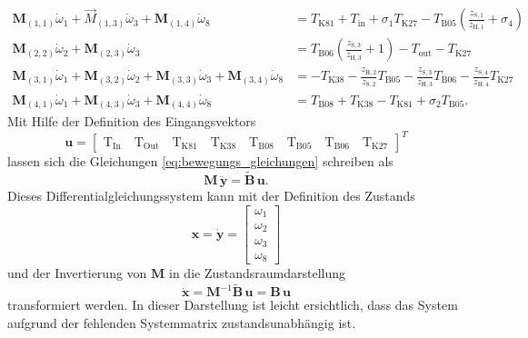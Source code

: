 \begin{subequations} \label{eq:bewegungs_gleichungen}
	\begin{align}
		\pmb{M}_{(1,1)} \dot{\omega}_1 + \Vec{M}_{(1,3)} \dot{\omega}_3 +\pmb{M}_{(1,4)} \dot{\omega}_8
		&= T_{\mathrm{K81}} +T_{\mathrm{in}} + \sigma_1 T_{\mathrm{K27}}-T_{\mathrm{B05}} {\left(\frac{z_{\mathrm{S,1}} }{z_{\mathrm{H,1}}}+\sigma_{4} \right)}\\
		\pmb{M}_{(2,2)} \dot{\omega}_2 + \pmb{M}_{(2,3)} \dot{\omega}_3
		&= T_{\mathrm{B06}} {\left(\frac{z_{\mathrm{S,3}} }{z_{\mathrm{H,3}} }+1\right)}-T_{\mathrm{out}} -T_{\mathrm{K27}} \\
		\pmb{M}_{(3,1)} \dot{\omega}_1 + \pmb{M}_{(3,2)} \dot{\omega}_2 + \pmb{M}_{(3,3)} \dot{\omega}_3 + \pmb{M}_{(3,4)} \dot{\omega}_8
		&= -T_{\mathrm{K38}} -\frac{ z_{\mathrm{H,2}} }{z_{\mathrm{S,2}} }T_{\mathrm{B05}}-\frac{z_{\mathrm{S,3}}}{z_{\mathrm{H,3}}}T_{\mathrm{B06}}-\frac{z_{\mathrm{S,4}} }{z_{\mathrm{H,4}}}T_{\mathrm{K27}}\\
		\pmb{M}_{(4,1)} \dot{\omega}_1 + \pmb{M}_{(4,3)} \dot{\omega}_3 + \pmb{M}_{(4,4)} \dot{\omega}_8
		&= T_{\mathrm{B08}} +T_{\mathrm{K38}} -T_{\mathrm{K81}} +\sigma_{2} T_{\mathrm{B05}}.
	\end{align}
\end{subequations}
Mit Hilfe der Definition des Eingangsvektors
\begin{equation}\label{eq:u}
\pmb{u} = \begin{bmatrix} \mathrm{T}_{\mathrm{In}} \quad \mathrm{T}_{\mathrm{Out}} \quad \mathrm{T}_{\mathrm{K81}} \quad \mathrm{T}_{\mathrm{K38}} \quad \mathrm{T}_{\mathrm{B08}} \quad \mathrm{T}_{\mathrm{B05}} \quad \mathrm{T}_{\mathrm{B06}} \quad \mathrm{T}_{\mathrm{K27}} \end{bmatrix}^T
\end{equation}
lassen sich die Gleichungen \eqref{eq:bewegungs_gleichungen} schreiben als
\begin{equation}
\pmb{M}\,\ddot{\pmb{y}} = \tilde{\pmb{B}}\,\pmb{u}.
\end{equation}
Dieses Differentialgleichungssystem kann mit der Definition des Zustands
\begin{equation}
\pmb{x} = \dot{\pmb{y}} = \begin{bmatrix} \omega_1 \\ \omega_2 \\ \omega_3 \\ \omega_8\end{bmatrix}
\end{equation}
und der Invertierung von $\pmb{M}$ in die Zustandsraumdarstellung 
\begin{equation}
\dot{\pmb{x}} = \pmb{M}^{-1}\tilde{\pmb{B}}\,\pmb{u} = \pmb{B}\,\pmb{u}
\end{equation}
transformiert werden. In dieser Darstellung ist leicht ersichtlich, dass das System aufgrund der fehlenden Systemmatrix zustandsunabhängig ist.

